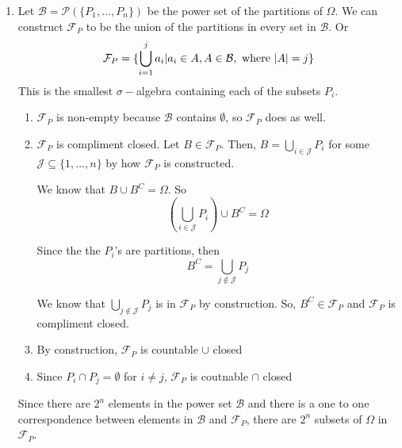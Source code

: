 \documentclass[12pt]{article}
\begin{document}

\begin{enumerate}[start=1,label={\bfseries Problem \arabic*:},leftmargin=1in] %
    \item Let $\mathcal{B} = \mathcal{P}(\{P_1, ..., P_n\})$ be the power set of the partitions of $\Omega$. 
    We can construct $\mathcal{F}_P$ to be the union of the partitions in every set in $\mathcal{B}$. 
    Or \[
        \mathcal{F}_P = \{ \bigcup_{i=1}^j a_i | a_i \in A, A \in \mathcal{B}, \textnormal{ where } |A| = j\}
    \]
    This is the smallest $\sigma-$algebra containing each of the subsets $P_i$. 

    \begin{enumerate}
        \item $\mathcal{F}_P$ is non-empty because $\mathcal{B}$ contains $\emptyset$, so $\mathcal{F}_P$ does as well.
        \item $\mathcal{F}_P$ is compliment closed. Let $B \in \mathcal{F}_P$.
        Then, $B = \bigcup_{i\in \mathcal{J}} P_i$ for some $\mathcal{J} \subseteq \{1, ..., n\}$ by how $\mathcal{F}_P$ is constructed. 
        
        We know that $B \cup B^C = \Omega$. So 
        \[
            (\bigcup_{i\in \mathcal{J}} P_i) \cup B^C = \Omega
        \]

        Since the the $P_i$'s are partitions, then 
        \[
            B^C = \bigcup_{j \not \in \mathcal{J}} P_j
        \]

        We know that $ \bigcup_{j \not \in \mathcal{J}} P_j$ is in $\mathcal{F}_{P}$ 
        by construction. So, $B^C \in \mathcal{F}_P$ and $\mathcal{F}_P$ is compliment closed. 

        \item By construction, $\mathcal{F}_P$ is countable $\cup$ closed
        \item Since $P_{i} \cap P_{j} = \emptyset$ for $i \neq j$, $\mathcal{F}_{P}$ is coutnable $\cap$ closed 
    \end{enumerate}    
    Since there are $2^n$ elements in the power set $\mathcal{B}$ and there is a one to one correspondence
    between elements in $\mathcal{B}$ and $\mathcal{F}_{P}$, there are $2^n$ subsets of $\Omega$ in $\mathcal{F}_P$. 
    

\end{enumerate}
\end{document}
